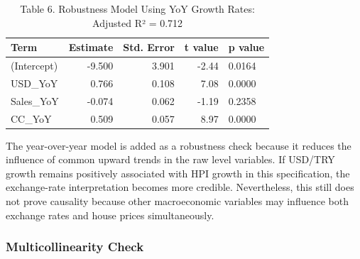 \documentclass[
  11pt,
  a4paper,
  DIV=11,
  numbers=noendperiod]{scrartcl}
\newenvironment{Shaded}{\begin{snugshade}}{\end{snugshade}}
\newcommand{\AttributeTok}[1]{\textcolor[rgb]{0.40,0.45,0.13}{#1}}
\newcommand{\ConstantTok}[1]{\textcolor[rgb]{0.56,0.35,0.01}{#1}}
\newcommand{\ControlFlowTok}[1]{\textcolor[rgb]{0.00,0.23,0.31}{\textbf{#1}}}
\newcommand{\DecValTok}[1]{\textcolor[rgb]{0.68,0.00,0.00}{#1}}
\newcommand{\FunctionTok}[1]{\textcolor[rgb]{0.28,0.35,0.67}{#1}}
\newcommand{\NormalTok}[1]{\textcolor[rgb]{0.00,0.23,0.31}{#1}}
\newcommand{\OtherTok}[1]{\textcolor[rgb]{0.00,0.23,0.31}{#1}}
\newcommand{\SpecialCharTok}[1]{\textcolor[rgb]{0.37,0.37,0.37}{#1}}
\newcommand{\StringTok}[1]{\textcolor[rgb]{0.13,0.47,0.30}{#1}}
\begin{document}
\begin{longtable}[t]{lrrrl}
\caption{\label{tab:yoy-model}Table 6. Robustness Model Using YoY Growth Rates: Adjusted R² = 0.712}\\
\toprule
Term & Estimate & Std. Error & t value & p value\\
\midrule
(Intercept) & -9.500 & 3.901 & -2.44 & 0.0164\\
USD\_YoY & 0.766 & 0.108 & 7.08 & 0.0000\\
Sales\_YoY & -0.074 & 0.062 & -1.19 & 0.2358\\
CC\_YoY & 0.509 & 0.057 & 8.97 & 0.0000\\
\bottomrule
\end{longtable}

The year-over-year model is added as a robustness check because it
reduces the influence of common upward trends in the raw level
variables. If USD/TRY growth remains positively associated with HPI
growth in this specification, the exchange-rate interpretation becomes
more credible. Nevertheless, this still does not prove causality because
other macroeconomic variables may influence both exchange rates and
house prices simultaneously.

\subsubsection{Multicollinearity Check}\label{multicollinearity-check}

\begin{Shaded}
\end{Shaded}
\end{document}

